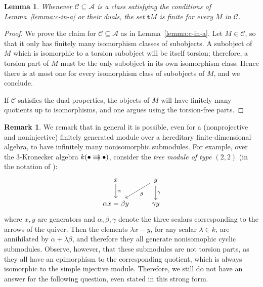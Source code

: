 \documentclass[a4paper,11pt]{amsart}
\theoremstyle{plain}
\newtheorem{lemma}[thm]{Lemma}
\theoremstyle{definition}
\newtheorem{rmk}[thm]{Remark}
\newcommand{\Acal}{\mathcal{A}} \newcommand{\Bcal}{\mathcal{B}} \newcommand{\Ccal}{\mathcal{C}}
\begin{document}
\begin{lemma}
	Whenever $\Ccal\subseteq\Acal$ is a class satisfying the conditions of
	Lemma~\ref{lemma:c-in-a} or their duals, the set $\mathbf{t}M$ is finite for
	every $M$ in $\Ccal$.
\end{lemma}

\begin{proof}
	We prove the claim for $\Ccal\subseteq\Acal$ as in Lemma~\ref{lemma:c-in-a}.
	Let $M\in \Ccal$, so that it only has finitely many isomorphism classes of
	subobjects. A subobject of $M$ which is isomorphic to a torsion
	subobject will be itself torsion; therefore, a torsion part of $M$ must be the
	only subobject in its own isomorphism class. Hence there is at most one for
	every isomorphism class of subobjects of $M$, and we conclude.

	If $\Ccal$ satisfies the dual properties, the objects of $M$ will have
	finitely many quotients up to isomorphisms, and one argues using the
	torsion-free parts.
\end{proof}

\begin{rmk}
	We remark that in general it is possible, even for a (nonprojective and
	noninjective) finitely generated module
	over a hereditary finite-dimensional algebra, to have infinitely many
	nonisomorphic submodules. For example, over the $3$-Kronecker algebra
	$k(\begin{tikzcd}[sep=10pt,cramped]\bullet \ar[shift left=2pt]{r}\ar{r}\ar[shift
	right=2pt]{r} & \bullet \end{tikzcd})$, consider the \emph{tree module of type
	$(2,2)$} (in the notation of \cite{ring-16}):
	\[\begin{tikzcd}
		x \ar{d}{\alpha} & y \ar{dl}{\beta} \ar{d}{\gamma} \\
		\alpha x=\beta y & \gamma y
	\end{tikzcd}\]
	where $x,y$ are generators and $\alpha, \beta, \gamma$ denote the three
	scalars corresponding to the arrows of the quiver. Then the 
	elements $\lambda x-y$, for any scalar $\lambda\in k$, are annihilated by
	$\alpha+\lambda\beta$, and therefore they all generate nonisomophic cyclic
	submodules.
	Observe, however, that these submodules are not torsion parts, as
	they all have an epimorphism to the corresponding quotient, which is always
	isomorphic to the simple injective module. Therefore, we still do not have an
	answer for the following question, even stated in this strong form.
\end{rmk}
\end{document}
